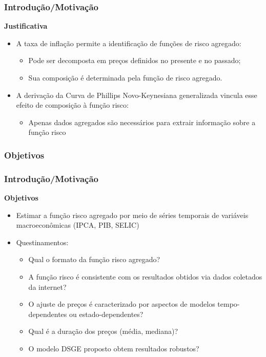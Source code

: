 \documentclass[aspectratio=169]{beamer}
\begin{document}
\begin{frame}\frametitle{Introdução/Motivação}
\textbf{Justificativa}
\begin{itemize}

\item A taxa de inflação permite a identificação de funções de risco agregado:
  \begin{itemize}
  \item Pode ser decomposta em preços definidos no presente e no passado;
  \item Sua composição é determinada pela função de risco agregado.
  \end{itemize}
\item A derivação da Curva de Phillips Novo-Keynesiana generalizada vincula esse efeito de composição à função risco:
  \begin{itemize}
  \item Apenas dados agregados são necessários para extrair informação sobre a função risco
  \end{itemize}
\end{itemize}
\end{frame}

\subsubsection{Objetivos}

\begin{frame}\frametitle{Introdução/Motivação}
\textbf{Objetivos}
\begin{itemize}
\item Estimar a função risco agregado por meio de séries temporais de variáveis macroeconômicas (IPCA, PIB, SELIC)
\item Questinamentos:
  \begin{itemize}
  \item Qual o formato da função risco agregado?
  \item A função risco é consistente com os resultados obtidos via dados coletados da internet?
  \item O ajuste de preços é caracterizado por aspectos de modelos tempo-dependentes ou estado-dependentes?
  \item Qual é a duração dos preços (média, mediana)?
  \item O modelo DSGE proposto obtem resultados robustos?
  \end{itemize}
\end{itemize}
\end{frame}
\end{document}
